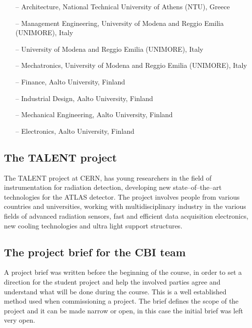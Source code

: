 \documentclass[english,12pt,a4paper,dvips]{article}
\begin{document}
\begin{itemize}
\item[--] Architecture, National Technical University of Athens (NTU), Greece
\item[--] Management Engineering, University of Modena and Reggio Emilia (UNIMORE), Italy
\item[--] University of Modena and Reggio Emilia (UNIMORE), Italy
\item[--] Mechatronics, University of Modena and Reggio Emilia (UNIMORE), Italy
\item[--] Finance, Aalto University, Finland
\item[--] Industrial Design, Aalto University, Finland
\item[--] Mechanical Engineering, Aalto University, Finland
\item[--] Electronics, Aalto University, Finland
\end{itemize}

\subsection{The TALENT project}

The TALENT project at CERN, has young researchers in the field of instrumentation for radiation detection, developing new state--of--the--art technologies for the ATLAS detector. The project involves people from various countries and universities, working with multidisciplinary industry in the various fields of advanced radiation sensors, fast and efficient data acquisition electronics, new cooling technologies and ultra light support structures.



\subsection{The project brief for the CBI team}

A project brief was written before the beginning of the course, in order to set a direction for the student project and help the involved parties agree and understand what will be done during the course. This is a well established method used when commissioning a project. The brief defines the scope of the project and it can be made narrow or open, in this case the initial brief was left very open.
\end{document}
